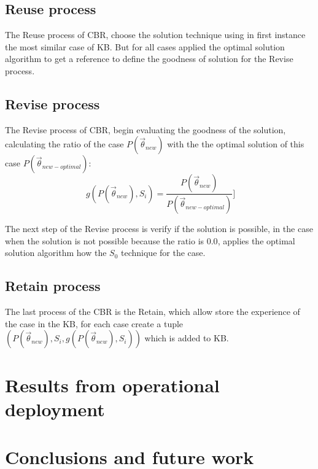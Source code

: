 \documentclass{IEEEtran}
\begin{document}
\subsection{Reuse process} 

The Reuse process of CBR, choose the solution technique using in first instance the most similar case of KB. But for all cases applied the optimal solution algorithm to get a reference to define the goodness of solution for the Revise process.

\subsection{Revise process} 

The Revise process of CBR, begin evaluating the goodness of the solution, calculating the ratio of the case $P(\vec{\theta}_{new})$ with the the optimal solution of this case $P(\vec{\theta}_{new-optimal})$:
\begin{equation}
\ g(P(\vec{\theta}_{new}),S_i)=\frac{P(\vec{\theta}_{new})}{P(\vec{\theta}_{new-optimal})}]
\end{equation}

The next step of the Revise process is verify if the solution is possible, in the case when the  solution is not possible because the ratio is $0.0$, applies the optimal solution algorithm how the $S_{0}$ technique for the case.

\subsection{Retain process} 

The last process of the CBR is the Retain, which allow store the experience of the case in the KB, for each case create a tuple $(P(\vec{\theta}_{new}),S_i,g(P(\vec{\theta}_{new}),S_i))$ which is added to KB.


\section{Results from operational deployment}
\label{outc}

\section{Conclusions and future work}
\label{concl}


\end{document}
